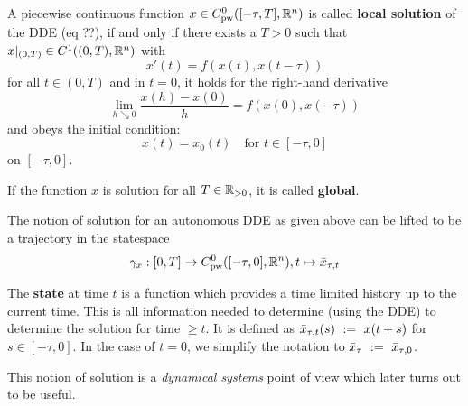 \begin{definition}
    \label{definition-solution-dde}

    A piecewise continuous function $x\in C^0_\text{pw}([-\tau,T],\mathbb{R}^n)$ is called \textbf{local solution} of the DDE (eq ??), if and only if there exists a $T>0$ such that $x|_{(0,T)}\in C^1((0,T),\mathbb{R}^n)$ with
    \begin{equation}
        x'(t) = f\left(x(t),x(t-\tau)\right)
    \end{equation}
    for all $t\in (0,T)$ and in $t=0$, it holds for the right-hand derivative \begin{equation}
        \lim_{h\searrow 0}\frac{x(h)-x(0)}{h}=f(x(0),x(-\tau))
    \end{equation}
    and obeys the initial condition:
    \begin{equation}
        x(t) = x_0(t) \quad\text{for } t\in [-\tau,0]
    \end{equation}
    on $[-\tau,0]$.



    If the function $x$ is solution for all $T\in\mathbb{R}_{>0}$, it is called \textbf{global}.

\end{definition}

The notion of solution for an autonomous DDE as given above can be lifted to be a trajectory in the statespace
\begin{equation}
    \gamma_x:[0,T]\rightarrow C^0_\text{pw}([-\tau,0],\mathbb{R}^n),\\ t\mapsto\bar{x}_{\tau,t}
\end{equation}

The \textbf{state} at time $t$ is a function which provides a time limited history up to the current time. This is all information needed to determine (using the DDE) to determine the solution for time $\geq t$. It is defined as $\bar{x}_{\tau,t}(s)~\mathrel{\mathop{:}}=~ x(t+s)$ for $s\in [-\tau,0]$. In the case of $t=0$, we simplify the notation to $\bar{x}_{\tau} ~\mathrel{\mathop{:}}=~ \bar{x}_{\tau,0}$.

This notion of solution is a \emph{dynamical systems} point of view which later turns out to be useful.


